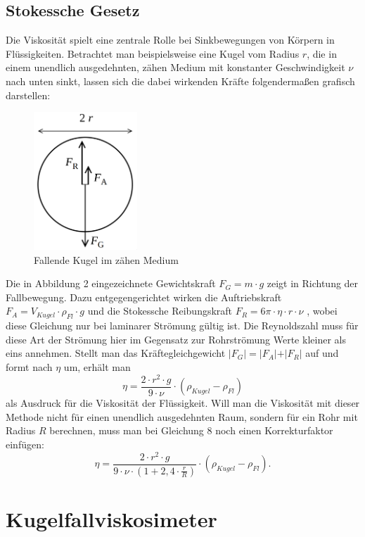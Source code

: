 \documentclass{article}
\begin{document}
\subsection{Stokessche Gesetz}
Die Viskosität spielt eine zentrale Rolle bei Sinkbewegungen von Körpern in Flüssigkeiten. Betrachtet
man beispielsweise eine Kugel vom Radius $r$, die in einem unendlich ausgedehnten, zähen Medium mit
konstanter Geschwindigkeit $\nu$ nach unten sinkt, lassen sich die dabei wirkenden Kräfte folgendermaßen
grafisch darstellen:
\begin{figure}[H]
\centering
\includegraphics[width=110pt]{stokes.png}
\caption{Fallende Kugel im zähen Medium \cite{1}}
\label{fig:length_eight_mouse}
\end{figure}
\noindent
Die in Abbildung 2 eingezeichnete Gewichtskraft $F_G = m \cdot g$ zeigt in Richtung der Fallbewegung. Dazu
entgegengerichtet wirken die Auftriebskraft $F_A = V_{Kugel} \cdot \rho_{Fl} \cdot g$ und die Stokessche Reibungskraft $F_R = 6 \pi \cdot \eta \cdot r \cdot \nu$ \cite{1}, wobei diese Gleichung nur bei laminarer Strömung gültig ist. Die Reynoldszahl muss für diese Art der Strömung hier im Gegensatz zur Rohrströmung Werte kleiner als eins annehmen. Stellt man das Kräftegleichgewicht $\vert F_G \vert = \vert F_A \vert + \vert F_R \vert $ auf und formt nach $\eta$ um, erhält man
\begin{equation}
    \eta = \frac{2 \cdot r^2 \cdot g}{9 \cdot \nu} \cdot (\rho_{Kugel} - \rho_{Fl})
\end{equation}
als Ausdruck für die Viskosität der Flüssigkeit. Will man die Viskosität mit dieser Methode nicht für einen unendlich ausgedehnten Raum, sondern für ein Rohr mit Radius $R$ berechnen, muss man bei Gleichung 8 noch einen Korrekturfaktor einfügen:
\begin{equation}
    \eta = \frac{2 \cdot r^2 \cdot g}{9 \cdot \nu \cdot (1+2,4 \cdot \frac{r}{R})} \cdot (\rho_{Kugel} - \rho_{Fl}).
\end{equation}
\section{Kugelfallviskosimeter}
\end{document}

